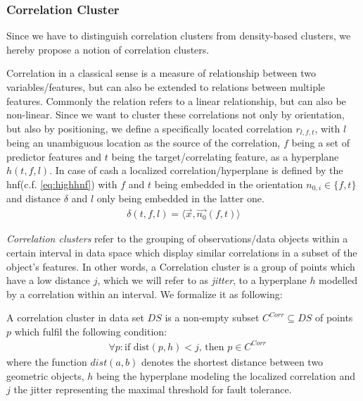 \subsubsection*{Correlation Cluster}
Since we have to distinguish correlation clusters from density-based clusters, we hereby propose a notion of correlation clusters.

Correlation in a classical sense is a measure of relationship between two variables/features, but can also be extended to relations between multiple features. Commonly the relation refers to a linear relationship, but can also be non-linear. Since we want to cluster these correlations not only by orientation, but also by positioning, we define a specifically located correlation $r_{l,f,t}$, with $l$ being an unambiguous location as the source of the correlation, $f$ being a set of predictor features and $t$ being the target/correlating feature, as a hyperplane $h(t,f,l)$. In case of \gls{cash} a localized correlation/hyperplane is defined by the \gls{hnf}(c.f. \autoref{eq:highhnf}) with $f$ and $t$ being embedded in the orientation $n_{0,i} \in \{f,t\}$ and distance $\delta$ and $l$ only being embedded in the latter one. 
\begin{align}
    \delta(t,f,l) = \langle \vec{x},\vec{n_0}(f,t) \rangle
\end{align}

\textit{Correlation clusters} refer to the grouping of observations/data objects within a certain interval in data space which display similar correlations in a subset of the object's features. In other words, a Correlation cluster is a group of points which have a low distance $j$, which we will refer to as \textit{jitter}, to a hyperplane $h$ modelled by a correlation within an interval. We formalize it as following:

A correlation cluster in data set $DS$ is a non-empty subset $C^{Corr} \subseteq DS$ of points $p$ which fulfil the following condition:
\begin{align}\label{eq:pointtohyplane}
    &\forall p: \text{if } \text{dist}(p,h) < j \text{, then } p \in C^{Corr}
\end{align}
where the function $dist(a,b)$ denotes the shortest distance between two geometric objects, $h$ being the hyperplane modeling the localized correlation and $j$ the jitter representing the maximal threshold for fault tolerance. 


